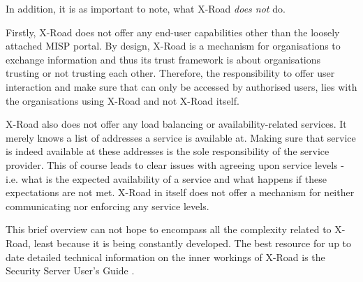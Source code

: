 \documentclass[10pt,a4paper]{article}
\begin{document}
\begin{appendices}
In addition, it is as important to note, what X-Road \emph{does not} do. 

Firstly, X-Road does not offer any end-user capabilities other than the loosely attached MISP portal. By design, X-Road is a mechanism for organisations to exchange information and thus its trust framework is about organisations trusting or not trusting each other. Therefore, the responsibility to offer user interaction and make sure that can only be accessed by authorised users, lies with the organisations using X-Road and not X-Road itself.

X-Road also does not offer any load balancing or availability-related services. It merely knows a list of addresses a service is available at. Making sure that service is indeed available at these addresses is the sole responsibility of the service provider. This of course leads to clear issues with agreeing upon service levels - i.e. what is the expected availability of a service and what happens if these expectations are not met. X-Road in itself does not offer a mechanism for neither communicating nor enforcing any service levels. 

This brief overview can not hope to encompass all the complexity related to X-Road, least because it is being constantly developed. The best resource for up to date detailed technical information on the inner workings of X-Road is the Security Server User's Guide \cite{xroadmanual}. 
\end{appendices}
\clearpage


 
\end{document}

